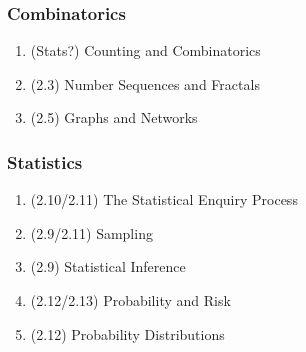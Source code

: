 \subsubsection*{Combinatorics}
\begin{enumerate}[resume]
  \item (Stats?) Counting and Combinatorics
  \item (2.3) Number Sequences and Fractals
  \item (2.5) Graphs and Networks
\end{enumerate}

\subsubsection*{Statistics}
\begin{enumerate}[resume]
  \item (2.10/2.11) The Statistical Enquiry Process
  \item (2.9/2.11) Sampling
  \item (2.9) Statistical Inference
  \item (2.12/2.13) Probability and Risk
  \item (2.12) Probability Distributions
\end{enumerate}


